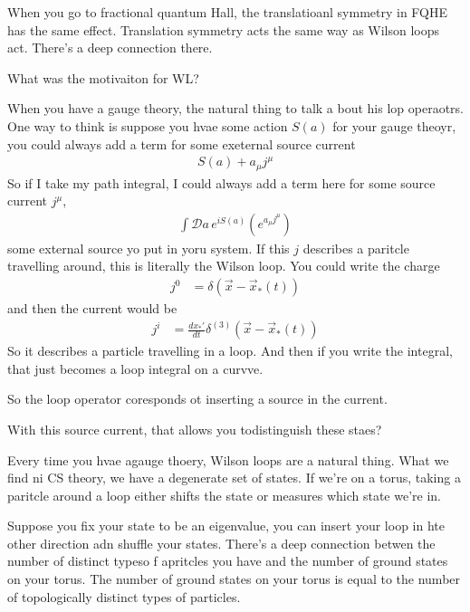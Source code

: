 When you go to fractional quantum Hall,
the translatioanl symmetry in FQHE has the same effect.
Translation symmetry acts the same way as Wilson loops act.
There's a deep connection there.


\begin{question}
    What was the motivaiton for WL?
\end{question}
When you have a gauge theory,
the natural thing to talk a bout his lop operaotrs.
One way to think is
suppose you hvae some action $S(a)$ for your gauge theoyr,
you could always add a term for some exeternal source current
\begin{align}
    S(a) + a_\mu j^\mu
\end{align}
So if I take my path integral,
I could always add a term here for some source current $j^\mu$,
\begin{align}
    \int \mathcal{D}a\,
    e^{i S(a)}
    \left( 
    e^{a_\mu j^\mu}
    \right)
\end{align}
some external source yo put in yoru system.
If this $j$ describes a paritcle travelling around,
this is literally the Wilson loop.
You could write the charge
\begin{align}
    j^0 &= \delta(\vec{x} - \vec{x}_*(t))
\end{align}
and then the current would be
\begin{align}
    j^i &= \frac{dx_*'}{dt} \delta^{(3)}(\vec{x} - \vec{x}_*(t))
\end{align}
So it describes a particle travelling in a loop.
And then if you write the integral,
that just becomes a loop integral on a curvve.

So the loop operator coresponds ot inserting a source in the current.

\begin{question}
    With this source current,
    that allows you todistinguish these staes?
\end{question}
Every time you hvae agauge thoery,
Wilson loops are a natural thing.
What we find ni CS theory,
we have a degenerate set of states.
If we're on a torus,
taking a paritcle around a loop 
either shifts the state or measures which state we're in.

Suppose you fix your state to be an eigenvalue,
you can insert your loop in hte other direction adn shuffle your states.
There's a deep connection betwen the number of distinct typeso f apritcles you
have and the number of ground states on your torus.
The number of ground states on your torus is equal to the number of
topologically distinct types of particles.

